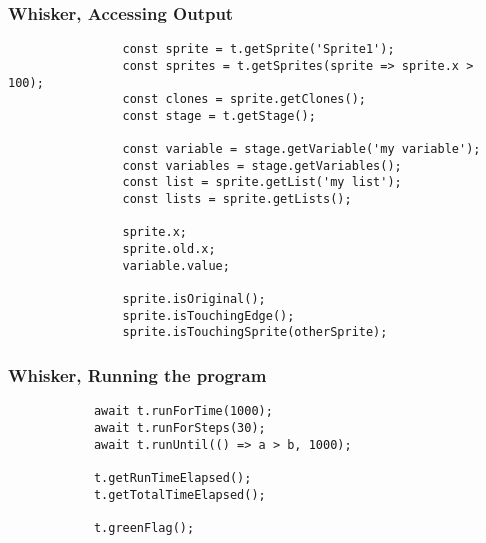 \begin{frame}[fragile]\frametitle{Whisker, Accessing Output}
    \begin{center}
        \begin{minipage}{.95\textwidth}
            \begin{verbatim}
                const sprite = t.getSprite('Sprite1');
                const sprites = t.getSprites(sprite => sprite.x > 100);
                const clones = sprite.getClones();
                const stage = t.getStage();

                const variable = stage.getVariable('my variable');
                const variables = stage.getVariables();
                const list = sprite.getList('my list');
                const lists = sprite.getLists();

                sprite.x;
                sprite.old.x;
                variable.value;

                sprite.isOriginal();
                sprite.isTouchingEdge();
                sprite.isTouchingSprite(otherSprite);
            \end{verbatim}
        \end{minipage}
    \end{center}
\end{frame}

\begin{frame}[fragile]\frametitle{Whisker, Running the program}
    \begin{center}
        \begin{minipage}{.95\textwidth}
            \begin{verbatim}
            await t.runForTime(1000);
            await t.runForSteps(30);
            await t.runUntil(() => a > b, 1000);

            t.getRunTimeElapsed();
            t.getTotalTimeElapsed();

            t.greenFlag();
            \end{verbatim}
        \end{minipage}
    \end{center}
\end{frame}


